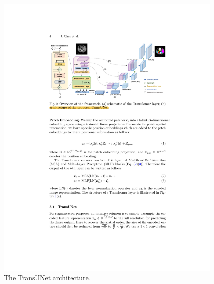 \begin{figure}[htb!]
  \centering
  \includegraphics[width=\textwidth]{assets/trans_u_net.pdf}
  \caption{The TransUNet architecture.}
  \label{trans_u_net}
\end{figure}



